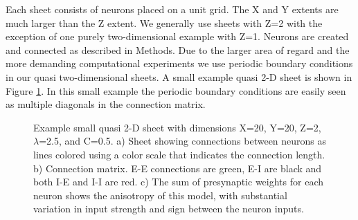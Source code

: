 Each sheet consists of neurons placed on a unit grid. 
The X and Y extents are much larger than the Z extent.
We generally use sheets with Z=2 with the exception of one purely two-dimensional example with Z=1.
Neurons are created and connected as described in Methods.
Due to the larger area of regard and the more demanding computational experiments we use periodic boundary conditions in our quasi two-dimensional sheets.
A small example quasi 2-D sheet is shown in Figure \ref{fig:sheet_structure}.
In this small example the periodic boundary conditions are easily seen as multiple diagonals in the connection matrix.

\begin{figure}[!htb]
 \caption{Example small quasi 2-D sheet with dimensions X=20, Y=20, Z=2, $\lambda$=2.5, and C=0.5. 
 a)  Sheet showing connections between neurons as lines colored using a color scale that indicates the connection length. 
 b)  Connection matrix. E-E connections are green, E-I are black and both I-E and I-I  are red. 
 c) The sum of presynaptic weights for each neuron shows the anisotropy of this model, with substantial variation in input strength and sign between the neuron inputs.}
 \label{fig:sheet_structure}
\end{figure}

